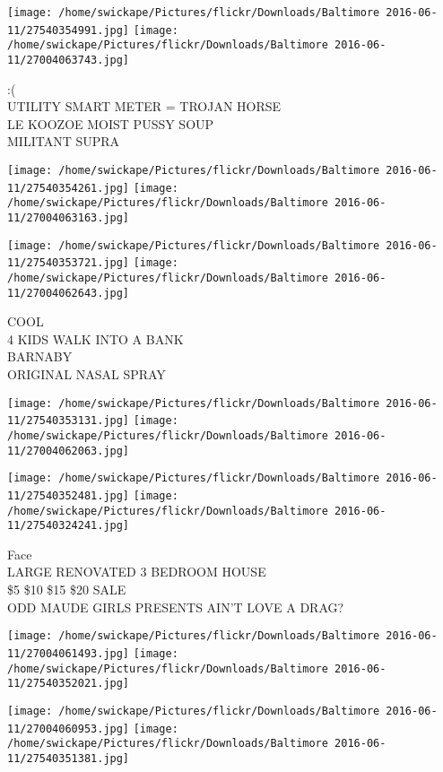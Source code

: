\documentclass[10pt,letterpaper]{article}
\begin{document}
\texttt{[image: /home/swickape/Pictures/flickr/Downloads/Baltimore 2016-06-11/27540354991.jpg]}
\texttt{[image: /home/swickape/Pictures/flickr/Downloads/Baltimore 2016-06-11/27004063743.jpg]}

:(\\
UTILITY SMART METER = TROJAN HORSE\\
LE KOOZOE MOIST PUSSY SOUP\\
MILITANT SUPRA\\
\pagebreak

\texttt{[image: /home/swickape/Pictures/flickr/Downloads/Baltimore 2016-06-11/27540354261.jpg]}
\texttt{[image: /home/swickape/Pictures/flickr/Downloads/Baltimore 2016-06-11/27004063163.jpg]}

\texttt{[image: /home/swickape/Pictures/flickr/Downloads/Baltimore 2016-06-11/27540353721.jpg]}
\texttt{[image: /home/swickape/Pictures/flickr/Downloads/Baltimore 2016-06-11/27004062643.jpg]}

COOL\\
4 KIDS WALK INTO A BANK\\
BARNABY\\
ORIGINAL NASAL SPRAY\\
\pagebreak

\texttt{[image: /home/swickape/Pictures/flickr/Downloads/Baltimore 2016-06-11/27540353131.jpg]}
\texttt{[image: /home/swickape/Pictures/flickr/Downloads/Baltimore 2016-06-11/27004062063.jpg]}

\texttt{[image: /home/swickape/Pictures/flickr/Downloads/Baltimore 2016-06-11/27540352481.jpg]}
\texttt{[image: /home/swickape/Pictures/flickr/Downloads/Baltimore 2016-06-11/27540324241.jpg]}

Face\\
LARGE RENOVATED 3 BEDROOM HOUSE\\
\$5 \$10 \$15 \$20 SALE\\
ODD MAUDE GIRLS PRESENTS AIN'T LOVE A DRAG?\\
\pagebreak

\texttt{[image: /home/swickape/Pictures/flickr/Downloads/Baltimore 2016-06-11/27004061493.jpg]}
\texttt{[image: /home/swickape/Pictures/flickr/Downloads/Baltimore 2016-06-11/27540352021.jpg]}

\texttt{[image: /home/swickape/Pictures/flickr/Downloads/Baltimore 2016-06-11/27004060953.jpg]}
\texttt{[image: /home/swickape/Pictures/flickr/Downloads/Baltimore 2016-06-11/27540351381.jpg]}
\end{document}

